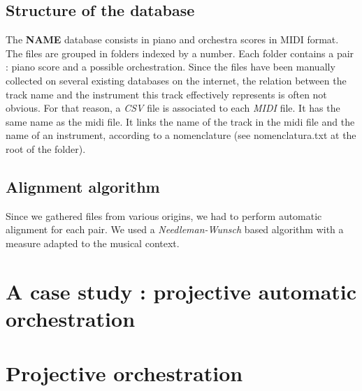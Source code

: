 \documentclass[twoside,twocolumn]{article}
\begin{document}
\subsection{Structure of the database}
The \textbf{NAME} database consists in piano and orchestra scores in MIDI format. 
The files are grouped in folders indexed by a number. Each folder contains a pair : piano score and a possible orchestration. 
Since the files have been manually collected on several existing databases on the internet,
the relation between the track name and the instrument this track effectively represents is often not obvious. For that reason, a \textit{CSV} file is associated to each \textit{MIDI} file. It has the same name as the midi file. It links the name of the track in the midi file and the name of an instrument, according to a nomenclature (see nomenclatura.txt at the root of the folder).

\subsection{Alignment algorithm}
Since we gathered files from various origins, we had to perform automatic alignment for each pair. We used a \textit{Needleman-Wunsch} based algorithm with a measure adapted to the musical context.

\section{A case study : projective automatic orchestration}


\section{Projective orchestration}






\end{document}
